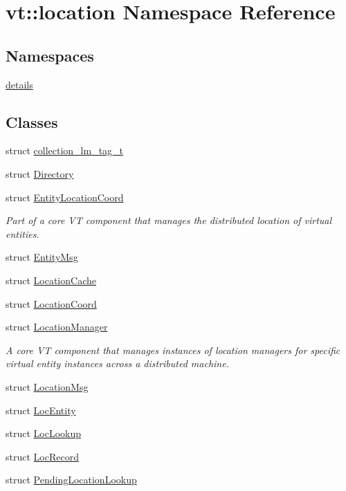 \hypertarget{namespacevt_1_1location}{}\section{vt\+:\+:location Namespace Reference}
\label{namespacevt_1_1location}
\subsection*{Namespaces}
\begin{DoxyCompactItemize}
\item 
 \hyperlink{namespacevt_1_1location_1_1details}{details}
\end{DoxyCompactItemize}
\subsection*{Classes}
\begin{DoxyCompactItemize}
\item 
struct \hyperlink{structvt_1_1location_1_1collection__lm__tag__t}{collection\+\_\+lm\+\_\+tag\+\_\+t}
\item 
struct \hyperlink{structvt_1_1location_1_1_directory}{Directory}
\item 
struct \hyperlink{structvt_1_1location_1_1_entity_location_coord}{Entity\+Location\+Coord}
\begin{DoxyCompactList}\small\item\em Part of a core VT component that manages the distributed location of virtual entities. \end{DoxyCompactList}\item 
struct \hyperlink{structvt_1_1location_1_1_entity_msg}{Entity\+Msg}
\item 
struct \hyperlink{structvt_1_1location_1_1_location_cache}{Location\+Cache}
\item 
struct \hyperlink{structvt_1_1location_1_1_location_coord}{Location\+Coord}
\item 
struct \hyperlink{structvt_1_1location_1_1_location_manager}{Location\+Manager}
\begin{DoxyCompactList}\small\item\em A core VT component that manages instances of location managers for specific virtual entity instances across a distributed machine. \end{DoxyCompactList}\item 
struct \hyperlink{structvt_1_1location_1_1_location_msg}{Location\+Msg}
\item 
struct \hyperlink{structvt_1_1location_1_1_loc_entity}{Loc\+Entity}
\item 
struct \hyperlink{structvt_1_1location_1_1_loc_lookup}{Loc\+Lookup}
\item 
struct \hyperlink{structvt_1_1location_1_1_loc_record}{Loc\+Record}
\item 
struct \hyperlink{structvt_1_1location_1_1_pending_location_lookup}{Pending\+Location\+Lookup}
\end{DoxyCompactItemize}
